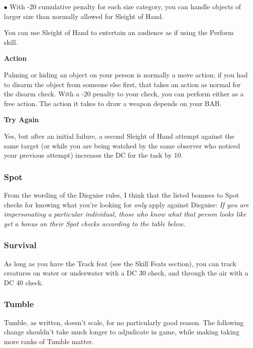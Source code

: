 \begin{list}{$\bullet$}{\itemspace}
	With -20 cumulative penalty for each size category, you can handle objects of larger size than normally allowed for Sleight of Hand.

	You can use Sleight of Hand to entertain an audience as if using the Perform skill.
	\item\textbf{Action}

	Palming or hiding an object on your person is normally a move action; if you had to disarm the object from someone else first, that takes an action as normal for the disarm check. With a -20 penalty to your check, you can perform either as a free action. The action it takes to draw a weapon depends on your BAB.

	\item\textbf{Try Again}

	Yes, but after an initial failure, a second Sleight of Hand attempt against the same target (or while you are being watched by the same observer who noticed your previous attempt) increases the DC for the task by 10.
\end{list}

\subsubsection{Spot}

From the wording of the Disguise rules, I think that the listed bonuses to Spot checks for knowing what you're looking for \textit{only} apply against Disguise: \textit{If you are impersonating a particular individual, those who know what that person looks like get a bonus on their Spot checks according to the table below.}

\subsubsection{Survival}

As long as you have the Track feat (see the Skill Feats section), you can track creatures on water or underwater with a DC 30 check, and through the air with a DC 40 check.

\subsubsection{Tumble}

Tumble, as written, doesn't scale, for no particularly good reason. The following change shouldn't take much longer to adjudicate in game, while making taking more ranks of Tumble matter.

